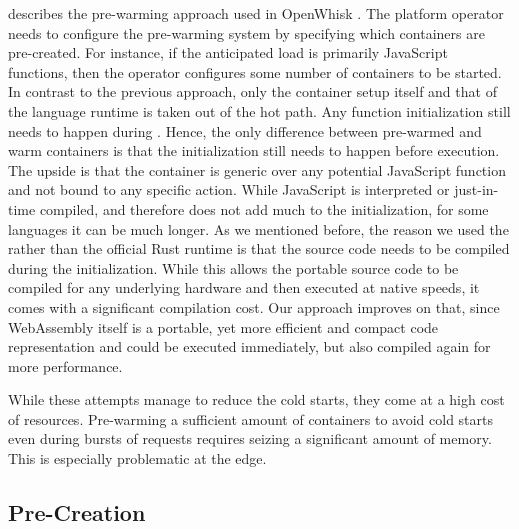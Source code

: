 \citeauthor{Thoemmes2017} describes the pre-warming approach used in OpenWhisk \cite{Thoemmes2017}. The platform operator needs to configure the pre-warming system by specifying which containers are pre-created. For instance, if the anticipated load is primarily JavaScript functions, then the operator configures some number of  containers to be started. In contrast to the previous approach, only the container setup itself and that of the language runtime is taken out of the hot path. Any function initialization still needs to happen during . Hence, the only difference between pre-warmed and warm containers is that the initialization still needs to happen before execution. The upside is that the container is generic over any potential JavaScript function and not bound to any specific action.
While JavaScript is interpreted or just-in-time compiled, and therefore does not add much to the initialization, for some languages it can be much longer. As we mentioned before, the reason we used the  rather than the official Rust runtime is that the source code needs to be compiled during the initialization. While this allows the portable source code to be compiled for any underlying hardware and then executed at native speeds, it comes with a significant compilation cost. Our approach improves on that, since WebAssembly itself is a portable, yet more efficient and compact code representation and could be executed immediately, but also compiled again for more performance.

While these attempts manage to reduce the cold starts, they come at a high cost of resources. Pre-warming a sufficient amount of containers to avoid cold starts even during bursts of requests requires seizing a significant amount of memory. This is especially problematic at the edge.

\subsection{Pre-Creation}

